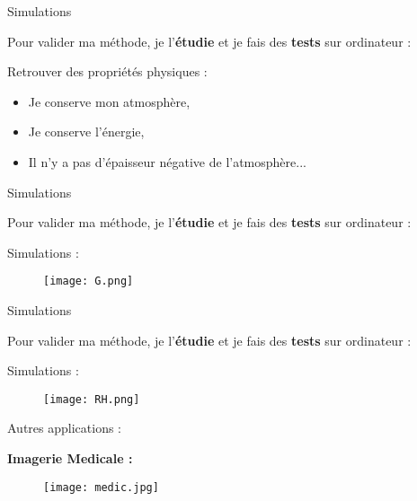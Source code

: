 \documentclass[11pt]{beamer}
\begin{document}

\begin{frame}{Simulations}

Pour valider ma méthode, je l'\textbf{étudie} et je fais des \textbf{tests} sur ordinateur :

\pause
Retrouver des propriétés physiques :
\begin{itemize}
\item Je conserve mon atmosphère,
\item Je conserve l'énergie,
\item Il n'y a pas d'épaisseur négative de l'atmosphère...
\end{itemize}

\end{frame}


\begin{frame}{Simulations}

Pour valider ma méthode, je l'\textbf{étudie} et je fais des \textbf{tests} sur ordinateur :

Simulations :
\begin{center}
\begin{figure}
\texttt{[image: G.png]}
\end{figure}
\end{center}

\end{frame}


\begin{frame}{Simulations}

Pour valider ma méthode, je l'\textbf{étudie} et je fais des \textbf{tests} sur ordinateur :

Simulations :
\begin{center}
\begin{figure}
\texttt{[image: RH.png]}
\end{figure}
\end{center}

\end{frame}


\begin{frame}{Autres applications :}

\textbf{Imagerie Medicale :}
\begin{center}
\begin{figure}
\texttt{[image: medic.jpg]}
\end{figure}
\end{center}

\end{frame}
\end{document}
